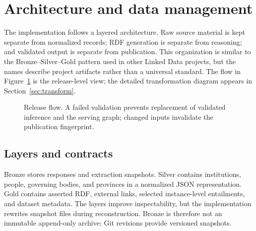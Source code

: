 \documentclass[11pt,a4paper]{article}
\begin{document}
\section{Architecture and data management}
The implementation follows a layered architecture. Raw source material is kept separate
from normalized records; RDF generation is separate from reasoning; and validated output is
separate from publication. This organization is similar to the Bronze--Silver--Gold pattern
used in other Linked Data projects, but the names describe project artifacts rather than a
universal standard. The flow in Figure~\ref{fig:release-flow} is the release-level view;
the detailed transformation diagram appears in Section~\ref{sec:transform}.
\begin{figure}[htbp]\centering
{}
\caption[Validated release flow]{Release flow. A failed validation prevents replacement of validated inference and the serving graph; changed inputs invalidate the publication fingerprint.}
\label{fig:release-flow}
\end{figure}

\subsection{Layers and contracts}
Bronze stores responses and extraction snapshots. Silver contains institutions, people,
governing bodies, and provinces in a normalized JSON representation. Gold contains
asserted RDF, external links, selected instance-level entailments, and dataset metadata.
The layers improve inspectability, but the implementation rewrites snapshot files during
reconstruction. Bronze is therefore not an immutable append-only archive; Git revisions
provide versioned snapshots.
\end{document}
